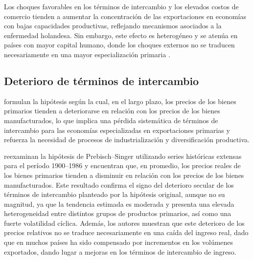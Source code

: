 \documentclass[../../PTFM.tex]{subfiles}
\begin{document}
	Los choques favorables en los términos de intercambio y los elevados costos de comercio tienden a aumentar la concentración de las exportaciones en economías con bajas capacidades productivas, reflejando mecanismos asociados a la enfermedad holandesa. Sin embargo, este efecto es heterogéneo y se atenúa en países con mayor capital humano, donde los choques externos no se traducen necesariamente en una mayor especialización primaria \parencite{Agosin2012}.
	
	\subsection{Deterioro de términos de intercambio}
	\label{subsec:deterioro-terminos-intercambio}
	
	\textcite{Prebisch1962,Singer1975} formulan la hipótesis según la cual, en el largo plazo, los precios de los bienes primarios tienden a deteriorarse en relación con los precios de los bienes manufacturados, lo que implica una pérdida sistemática de términos de intercambio para las economías especializadas en exportaciones primarias y refuerza la necesidad de procesos de industrialización y diversificación productiva.
	
	\textcite{Grilli1988} reexaminan la hipótesis de Prebisch--Singer utilizando series históricas extensas para el período 1900--1986 y encuentran que, en promedio, los precios reales de los bienes primarios tienden a disminuir en relación con los precios de los bienes manufacturados. Este resultado confirma el signo del deterioro secular de los términos de intercambio planteado por la hipótesis original, aunque no su magnitud, ya que la tendencia estimada es moderada y presenta una elevada heterogeneidad entre distintos grupos de productos primarios, así como una fuerte volatilidad cíclica. Además, los autores muestran que este deterioro de los precios relativos no se traduce necesariamente en una caída del ingreso real, dado que en muchos países ha sido compensado por incrementos en los volúmenes exportados, dando lugar a mejoras en los términos de intercambio de ingreso.
	
\end{document}
